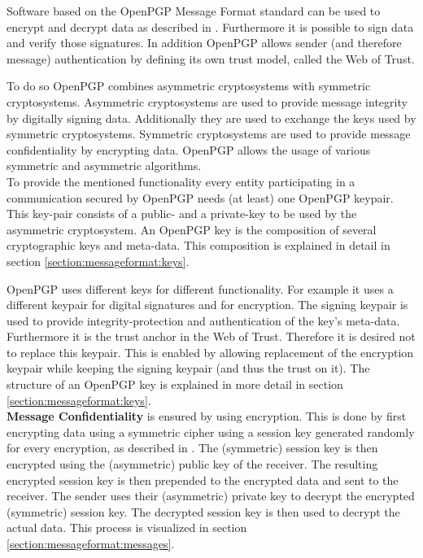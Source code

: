 Software based on the OpenPGP Message Format standard can be used to encrypt and decrypt data as described in \cite[section 2]{RFC4880}. Furthermore it is possible to sign data and verify those signatures. In addition OpenPGP allows sender (and therefore message) authentication by defining its own trust model, called the Web of Trust. 

To do so OpenPGP combines asymmetric cryptosystems with symmetric cryptosystems. Asymmetric cryptosystems are used to provide message integrity by digitally signing data. Additionally they are used to exchange the keys used by symmetric cryptosystems. Symmetric cryptosystems are used to provide message confidentiality by encrypting data. OpenPGP allows the usage of various symmetric and asymmetric algorithms. \\


To provide the mentioned functionality every entity participating in a communication secured by OpenPGP needs (at least) one OpenPGP keypair. This key-pair consists of a public- and a private-key to be used by the asymmetric cryptosystem. An OpenPGP key is the composition of several cryptographic keys and meta-data. This composition is explained in detail in section \ref{section:messageformat:keys}. 


OpenPGP uses different keys for different functionality. For example it uses a different keypair for digital signatures and for encryption. The signing keypair is used to provide integrity-protection and authentication of the key's meta-data. Furthermore it is the trust anchor in the Web of Trust. Therefore it is desired not to replace this keypair. This is enabled by allowing replacement of the encryption keypair while keeping the signing keypair (and thus the trust on it). The structure of an OpenPGP key is explained in more detail in section \ref{section:messageformat:keys}. \\


\textbf{Message Confidentiality} is ensured by using encryption. This is done by first encrypting data using a symmetric cipher using a session key generated randomly for every encryption, as described in \cite[section 2.1]{RFC4880}. The (symmetric) session key is then encrypted using the (asymmetric) public key of the receiver. The resulting encrypted session key is then prepended to the encrypted data and sent to the receiver. The sender uses their (asymmetric) private key to decrypt the encrypted (symmetric) session key. The decrypted session key is then used to decrypt the actual data. This process is visualized in section \ref{section:messageformat:messages}. %

